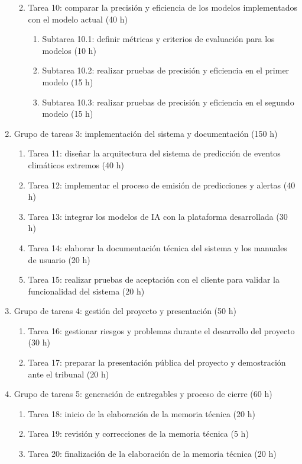 \documentclass[
11pt, %
codirector, %
]{charter}
\begin{document}
\begin{enumerate}
\begin{enumerate}
\begin{enumerate}
	\end{enumerate}	
	\item Tarea 10: comparar la precisión y eficiencia de los modelos implementados con el modelo actual (40 h)
	\begin{enumerate}
	\item Subtarea 10.1: definir métricas y criterios de evaluación para los modelos (10 h)
	\item Subtarea 10.2: realizar pruebas de precisión y eficiencia en el primer modelo (15 h)
	\item Subtarea 10.3: realizar pruebas de precisión y eficiencia en el segundo modelo (15 h)
	\end{enumerate}
	\end{enumerate}
\item Grupo de tareas 3: implementación del sistema y documentación (150 h)
\begin{enumerate}
	\item Tarea 11: diseñar la arquitectura del sistema de predicción de eventos climáticos extremos (40 h)
	\item Tarea 12: implementar el proceso de emisión de predicciones y alertas (40 h)
	\item Tarea 13: integrar los modelos de IA con la plataforma desarrollada (30 h)
	\item Tarea 14: elaborar la documentación técnica del sistema y los manuales de usuario (20 h)
	\item Tarea 15: realizar pruebas de aceptación con el cliente para validar la funcionalidad del sistema (20 h)
	\end{enumerate}
\item Grupo de tareas 4: gestión del proyecto y presentación (50 h)
\begin{enumerate}
	\item Tarea 16: gestionar riesgos y problemas durante el desarrollo del proyecto (30 h)
	\item Tarea 17: preparar la presentación pública del proyecto y demostración ante el tribunal (20 h)
	\end{enumerate}
\item Grupo de tareas 5: generación de entregables y proceso de cierre (60 h)
\begin{enumerate}
	\item Tarea 18: inicio de la elaboración de la memoria técnica (20 h)
	\item Tarea 19: revisión y correcciones de la memoria técnica (5 h)
	\item Tarea 20: finalización de la elaboración de la memoria técnica (20 h)

\end{enumerate}
\end{enumerate}
\end{document}
